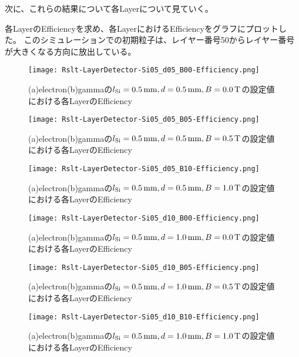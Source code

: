 \documentclass[a4paper,10pt]{jreport}
\begin{document}
次に、これらの結果について各Layerについて見ていく。

各LayerのEfficiencyを求め、各LayerにおけるEfficiencyをグラフにプロットした。
このシミュレーションでの初期粒子は、レイヤー番号50からレイヤー番号が大きくなる方向に放出している。

\begin{figure}[H]
	\center
	\texttt{[image: Rslt-LayerDetector-Si05\_d05\_B00-Efficiency.png]}
	\caption{(a)electron(b)gammaの$l_{\rm{Si}}=\SI{0.5}{mm}, d=\SI{0.5}{mm}, B=\SI{0.0}{T}$の設定値における各LayerのEfficiency}
	\label{Rslt-LayerDetector-Si05_d05_B00-Efficiency}
\end{figure}

\begin{figure}[H]
	\center
	\texttt{[image: Rslt-LayerDetector-Si05\_d05\_B05-Efficiency.png]}
	\caption{(a)electron(b)gammaの$l_{\rm{Si}}=\SI{0.5}{mm}, d=\SI{0.5}{mm}, B=\SI{0.5}{T}$の設定値における各LayerのEfficiency}
	\label{Rslt-LayerDetector-Si05_d05_B05-Efficiency}
\end{figure}

\begin{figure}[H]
	\center
	\texttt{[image: Rslt-LayerDetector-Si05\_d05\_B10-Efficiency.png]}
	\caption{(a)electron(b)gammaの$l_{\rm{Si}}=\SI{0.5}{mm}, d=\SI{0.5}{mm}, B=\SI{1.0}{T}$の設定値における各LayerのEfficiency}
	\label{Rslt-LayerDetector-Si05_d05_B10-Efficiency}
\end{figure}

\begin{figure}[H]
	\center
	\texttt{[image: Rslt-LayerDetector-Si05\_d10\_B00-Efficiency.png]}
	\caption{(a)electron(b)gammaの$l_{\rm{Si}}=\SI{0.5}{mm}, d=\SI{1.0}{mm}, B=\SI{0.0}{T}$の設定値における各LayerのEfficiency}
	\label{Rslt-LayerDetector-Si05_d10_B00-Efficiency}
\end{figure}

\begin{figure}[H]
	\center
	\texttt{[image: Rslt-LayerDetector-Si05\_d10\_B05-Efficiency.png]}
	\caption{(a)electron(b)gammaの$l_{\rm{Si}}=\SI{0.5}{mm}, d=\SI{1.0}{mm}, B=\SI{0.5}{T}$の設定値における各LayerのEfficiency}
	\label{Rslt-LayerDetector-Si05_d10_B05-Efficiency}
\end{figure}

\begin{figure}[H]
	\center
	\texttt{[image: Rslt-LayerDetector-Si05\_d10\_B10-Efficiency.png]}
	\caption{(a)electron(b)gammaの$l_{\rm{Si}}=\SI{0.5}{mm}, d=\SI{1.0}{mm}, B=\SI{1.0}{T}$の設定値における各LayerのEfficiency}
	\label{Rslt-LayerDetector-Si05_d10_B10-Efficiency}
\end{figure}
\end{document}
